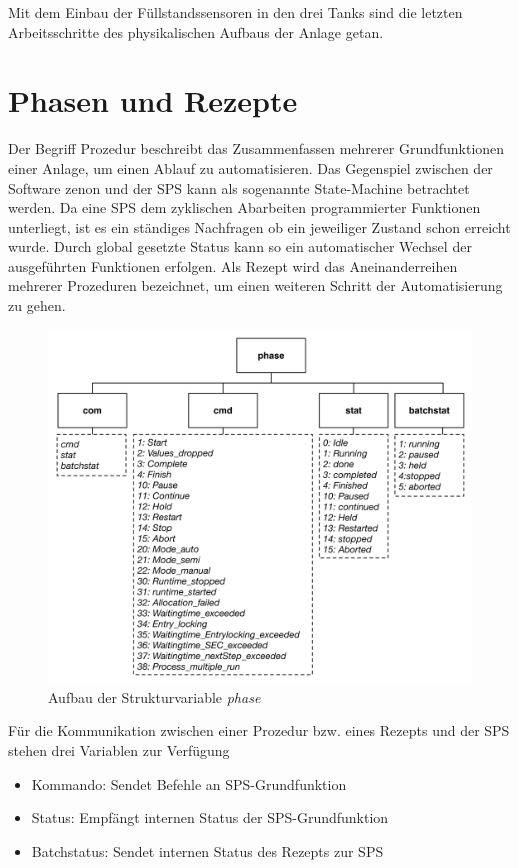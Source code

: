 	Mit dem Einbau der Füllstandssensoren in den drei Tanks sind die letzten Arbeitsschritte des physikalischen Aufbaus der Anlage getan.

\section{Phasen und Rezepte}
	Der Begriff Prozedur beschreibt das Zusammenfassen mehrerer Grundfunktionen einer Anlage, um einen Ablauf zu automatisieren. Das Gegenspiel zwischen der Software zenon und der SPS kann als sogenannte \glqq State-Machine \grqq \space betrachtet werden. Da eine SPS dem zyklischen Abarbeiten programmierter Funktionen unterliegt, ist es ein ständiges Nachfragen ob ein jeweiliger Zustand schon erreicht wurde. Durch global gesetzte Status kann so ein automatischer Wechsel der ausgeführten Funktionen erfolgen. Als Rezept wird das Aneinanderreihen mehrerer Prozeduren bezeichnet, um einen weiteren Schritt der Automatisierung zu gehen.\\

\begin{figure}[h!]
  \centering
  \includegraphics[height=0.6\textwidth]{graphics/implementation/Datentyp_Phase.jpg}
  \caption{Aufbau der Strukturvariable \glqq \textit{phase}\grqq}
\end{figure}
	
	Für die Kommunikation zwischen einer Prozedur bzw. eines Rezepts und der SPS stehen drei Variablen zur Verfügung
	
	\begin{itemize}
		\item Kommando: Sendet Befehle an SPS-Grundfunktion
		\item Status: Empfängt internen Status der SPS-Grundfunktion
		\item Batchstatus: Sendet internen Status des Rezepts zur SPS
	\end{itemize}

